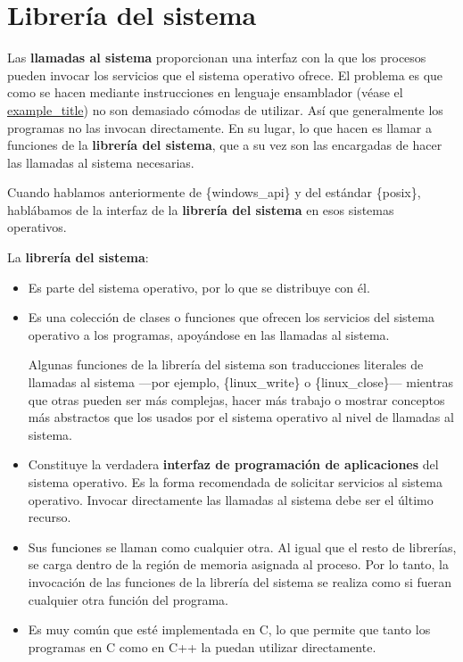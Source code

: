 \section{Librería del sistema}\label{_libreruxeda_del_sistema}

{} Las \textbf{llamadas al sistema} proporcionan una interfaz con la que
los procesos pueden invocar los servicios que el sistema operativo
ofrece. El problema es que como se hacen mediante instrucciones en
lenguaje ensamblador (véase el
\hyperref[ejemplo-linux-mips-syscall]{example\_title}) no son demasiado
cómodas de utilizar. Así que generalmente los programas no las invocan
directamente. En su lugar, lo que hacen es llamar a funciones de la
\textbf{librería del sistema}, que a su vez son las encargadas de hacer
las llamadas al sistema necesarias.

Cuando hablamos anteriormente de \{windows\_api\} y del estándar
\{posix\}, hablábamos de la interfaz de la \textbf{librería del sistema}
en esos sistemas operativos.

La \textbf{librería del sistema}:

\begin{itemize}
\item
  Es parte del sistema operativo, por lo que se distribuye con él.
\item
  Es una colección de clases o funciones que ofrecen los servicios del
  sistema operativo a los programas, apoyándose en las llamadas al
  sistema.

  Algunas funciones de la librería del sistema son traducciones
  literales de llamadas al sistema ---por ejemplo, \{linux\_write\} o
  \{linux\_close\}--- mientras que otras pueden ser más complejas, hacer
  más trabajo o mostrar conceptos más abstractos que los usados por el
  sistema operativo al nivel de llamadas al sistema.
\item
  Constituye la verdadera \textbf{interfaz de programación de
  aplicaciones} del sistema operativo. Es la forma recomendada de
  solicitar servicios al sistema operativo. Invocar directamente las
  llamadas al sistema debe ser el último recurso.
\item
  Sus funciones se llaman como cualquier otra. Al igual que el resto de
  librerías, se carga dentro de la región de memoria asignada al
  proceso. Por lo tanto, la invocación de las funciones de la librería
  del sistema se realiza como si fueran cualquier otra función del
  programa.
\item
  Es muy común que esté implementada en C, lo que permite que tanto los
  programas en C como en C++ la puedan utilizar directamente.
\end{itemize}


